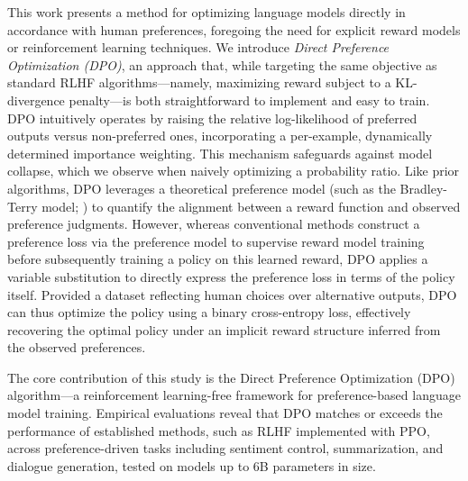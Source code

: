 This work presents a method for optimizing language models directly in accordance with human preferences, foregoing the need for explicit reward models or reinforcement learning techniques. We introduce \textit{Direct Preference Optimization (DPO)}, an approach that, while targeting the same objective as standard RLHF algorithms—namely, maximizing reward subject to a KL-divergence penalty—is both straightforward to implement and easy to train. DPO intuitively operates by raising the relative log-likelihood of preferred outputs versus non-preferred ones, incorporating a per-example, dynamically determined importance weighting. This mechanism safeguards against model collapse, which we observe when naively optimizing a probability ratio. Like prior algorithms, DPO leverages a theoretical preference model (such as the Bradley-Terry model; \cite{bradley1952rankanalysis}) to quantify the alignment between a reward function and observed preference judgments. However, whereas conventional methods construct a preference loss via the preference model to supervise reward model training before subsequently training a policy on this learned reward, DPO applies a variable substitution to directly express the preference loss in terms of the policy itself. Provided a dataset reflecting human choices over alternative outputs, DPO can thus optimize the policy using a binary cross-entropy loss, effectively recovering the optimal policy under an implicit reward structure inferred from the observed preferences.

The core contribution of this study is the Direct Preference Optimization (DPO) algorithm—a reinforcement learning-free framework for preference-based language model training. Empirical evaluations reveal that DPO matches or exceeds the performance of established methods, such as RLHF implemented with PPO, across preference-driven tasks including sentiment control, summarization, and dialogue generation, tested on models up to 6B parameters in size.

